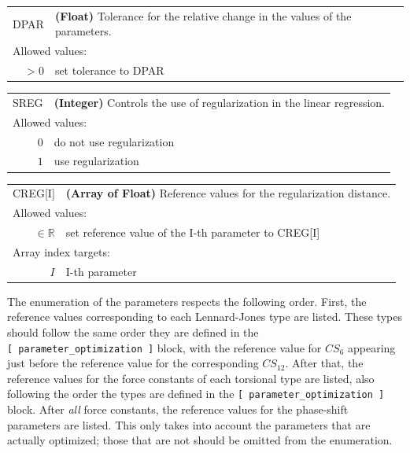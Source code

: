 \documentclass[10pt,a4paper,openany]{memoir}
\numberwithin{equation}{section}
\begin{document}
{
\begin{tabular}{r@{ : }l}
\label{descr:dpar}
   DPAR&\textbf{(Float)} Tolerance for the relative change in the values of the parameters.                                                                           \\ 
\multicolumn{2}{l}{Allowed values:} \\ 
    \(>0\)&set tolerance to DPAR         \\ 
\end{tabular}
\vspace{1ex}
}

{
\begin{tabular}{r@{ : }l}
\label{descr:sreg}
     SREG&\textbf{(Integer)} Controls the use of regularization in the linear regression.                                                             \\ 
\multicolumn{2}{l}{Allowed values:} \\ 
    \(0\)& do not use regularization \\ 
    \(1\)& use regularization \\
\end{tabular}
\vspace{1ex}
}
{

\begin{tabular}{r@{ : }l}
\label{descr:creg}
     CREG[I]&\textbf{(Array of Float)} Reference values for the regularization distance.        \\ 
\multicolumn{2}{l}{Allowed values:} \\ 
    \( \in \mathbb{R} \)& set reference value of the I-th parameter to CREG[I]\\ 
\multicolumn{2}{l}{Array index targets:} \\ 
    \( I \)& I-th parameter\\ 
\end{tabular}


The enumeration of the parameters respects the following order.
%
First, the reference values corresponding to each Lennard-Jones type
are listed.
%
These types should follow the same order they are defined in the
\texttt{[~parameter\_optimization~]} block, with the reference value
for $CS_6$ appearing just before the reference value for the
corresponding $CS_{12}$.
%
After that, the reference values for the force constants of each
torsional type are listed, also following the order the types are
defined in the \texttt{[~parameter\_optimization~]} block.
%
After \textit{all} force constants, the reference values for the
phase-shift parameters are listed.
%
This only takes into account the parameters that are actually
optimized; those that are not should be omitted from the enumeration.

\vspace{1ex}
}
\end{document}
